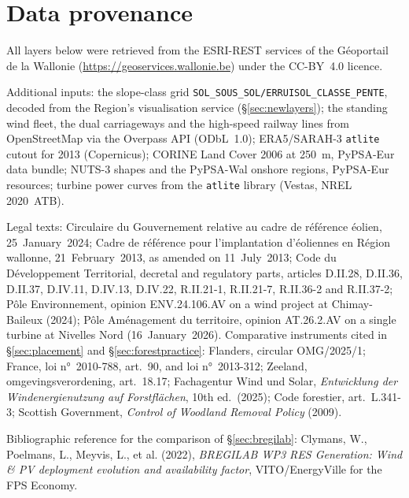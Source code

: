 \documentclass[11pt,a4paper]{article}
\begin{document}
\section{Data provenance}\label{sec:sources}

All layers below were retrieved from the ESRI-REST services of the Géoportail de
la Wallonie (\url{https://geoservices.wallonie.be}) under the CC-BY~4.0 licence.

\begin{table}[htbp]\centering\small
\caption{Source datasets, as retrieved.}

\end{table}

\medskip\noindent
Additional inputs: the slope-class grid
\texttt{SOL\_SOUS\_SOL/ERRUISOL\_CLASSE\_PENTE}, decoded from the Region's
visualisation service (§\ref{sec:newlayers}); the standing wind fleet, the dual
carriageways and the high-speed railway lines from OpenStreetMap via the
Overpass API (ODbL~1.0); ERA5/SARAH-3 \texttt{atlite} cutout for 2013
(Copernicus); CORINE Land Cover 2006 at \SI{250}{\metre}, PyPSA-Eur data bundle;
NUTS-3 shapes and the PyPSA-Wal onshore regions, PyPSA-Eur resources; turbine
power curves from the \texttt{atlite} library (Vestas, NREL 2020~ATB).

\medskip\noindent
Legal texts: Circulaire du Gouvernement relative au cadre de référence éolien,
25~January~2024; Cadre de référence pour l'implantation d'éoliennes en Région
wallonne, 21~February~2013, as amended on 11~July~2013; Code du Développement
Territorial, decretal and regulatory parts, articles D.II.28, D.II.36, D.II.37,
D.IV.11, D.IV.13, D.IV.22, R.II.21-1, R.II.21-7, R.II.36-2 and R.II.37-2;
Pôle Environnement, opinion ENV.24.106.AV on a wind project at Chimay-Baileux
(2024); Pôle Aménagement du territoire, opinion AT.26.2.AV on a single turbine
at Nivelles Nord (16~January~2026). Comparative instruments cited in
§\ref{sec:placement} and §\ref{sec:forestpractice}: Flanders, circular
OMG/2025/1; France, loi n°~2010-788, art.~90, and loi n°~2013-312; Zeeland,
omgevingsverordening, art.~18.17; Fachagentur Wind und Solar, \emph{Entwicklung
der Windenergienutzung auf Forstflächen}, 10th ed.\ (2025); Code forestier,
art.~L.341-3; Scottish Government, \emph{Control of Woodland Removal Policy}
(2009).

\medskip\noindent
Bibliographic reference for the comparison of §\ref{sec:bregilab}: Clymans, W.,
Poelmans, L., Meyvis, L., et al. (2022), \emph{BREGILAB WP3 RES Generation: Wind
\& PV deployment evolution and availability factor}, VITO/EnergyVille for the
FPS Economy.
\end{document}
